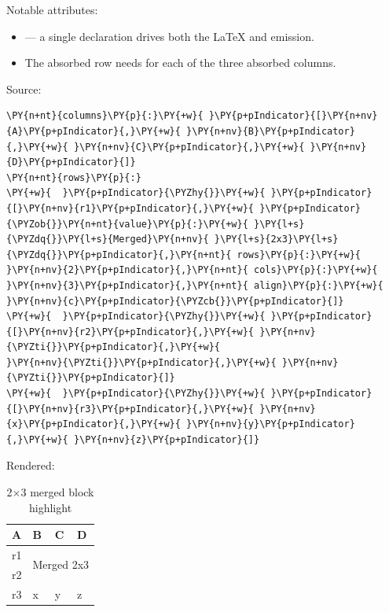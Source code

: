\documentclass[a4paper,twoside]{article}
\begin{document}
Notable attributes:
\begin{itemize}
\item {} --- a single declaration
drives both the \LaTeX{}  and  emission.
\item The absorbed row needs \tscodeinline{\textasciitilde{}} for each of the three absorbed columns.
\end{itemize}
Source:
\begin{tscode}[lang=yaml, engine=pygments]
\begin{Verbatim}[commandchars=\\\{\},breaklines, breakanywhere, commandchars=\\\{\}]
\PY{n+nt}{columns}\PY{p}{:}\PY{+w}{ }\PY{p+pIndicator}{[}\PY{n+nv}{A}\PY{p+pIndicator}{,}\PY{+w}{ }\PY{n+nv}{B}\PY{p+pIndicator}{,}\PY{+w}{ }\PY{n+nv}{C}\PY{p+pIndicator}{,}\PY{+w}{ }\PY{n+nv}{D}\PY{p+pIndicator}{]}
\PY{n+nt}{rows}\PY{p}{:}
\PY{+w}{  }\PY{p+pIndicator}{\PYZhy{}}\PY{+w}{ }\PY{p+pIndicator}{[}\PY{n+nv}{r1}\PY{p+pIndicator}{,}\PY{+w}{ }\PY{p+pIndicator}{\PYZob{}}\PY{n+nt}{value}\PY{p}{:}\PY{+w}{ }\PY{l+s}{\PYZdq{}}\PY{l+s}{Merged}\PY{n+nv}{ }\PY{l+s}{2x3}\PY{l+s}{\PYZdq{}}\PY{p+pIndicator}{,}\PY{n+nt}{ rows}\PY{p}{:}\PY{+w}{ }\PY{n+nv}{2}\PY{p+pIndicator}{,}\PY{n+nt}{ cols}\PY{p}{:}\PY{+w}{ }\PY{n+nv}{3}\PY{p+pIndicator}{,}\PY{n+nt}{ align}\PY{p}{:}\PY{+w}{ }\PY{n+nv}{c}\PY{p+pIndicator}{\PYZcb{}}\PY{p+pIndicator}{]}
\PY{+w}{  }\PY{p+pIndicator}{\PYZhy{}}\PY{+w}{ }\PY{p+pIndicator}{[}\PY{n+nv}{r2}\PY{p+pIndicator}{,}\PY{+w}{ }\PY{n+nv}{\PYZti{}}\PY{p+pIndicator}{,}\PY{+w}{                                                 }\PY{n+nv}{\PYZti{}}\PY{p+pIndicator}{,}\PY{+w}{ }\PY{n+nv}{\PYZti{}}\PY{p+pIndicator}{]}
\PY{+w}{  }\PY{p+pIndicator}{\PYZhy{}}\PY{+w}{ }\PY{p+pIndicator}{[}\PY{n+nv}{r3}\PY{p+pIndicator}{,}\PY{+w}{ }\PY{n+nv}{x}\PY{p+pIndicator}{,}\PY{+w}{ }\PY{n+nv}{y}\PY{p+pIndicator}{,}\PY{+w}{ }\PY{n+nv}{z}\PY{p+pIndicator}{]}
\end{Verbatim}
\end{tscode}
Rendered:
\begin{table}[H]
\centering
\caption{2\(\times\)3 merged block highlight}
\vspace{0.5em}
\begin{tabular}{llll}
\toprule
A & B & C & D \\
\midrule
r1 & \multicolumn{3}{c}{\multirow{2}{*}{Merged 2x3}} \\
r2 & \multicolumn{3}{c}{} \\
r3 & x & y & z \\
\bottomrule
\end{tabular}
\end{table}
\end{document}
